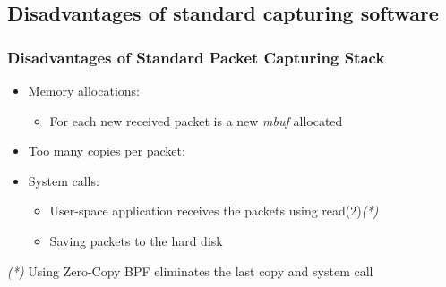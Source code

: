 \subsection*{Disadvantages of standard capturing software}
\begin{frame}
\frametitle{Disadvantages of Standard Packet Capturing Stack}
\begin{itemize}
	\item<2-> Memory allocations:
		\begin{itemize}
			\item<2-> For each new received packet is a new \emph{mbuf} 
				allocated\newline
		\end{itemize}


	\item<3-> Too many copies per packet:
		\begin{itemize}
		\end{itemize}

	\item<4-> System calls:
		\begin{itemize}
			\item<4-> User-space application receives the packets using read(2)\emph{(*)}
			\item<4-> Saving packets to the hard disk\newline
		\end{itemize}

\end{itemize}
\begin{tiny}
\emph{(*)} Using Zero-Copy BPF eliminates the last copy and system call
\end{tiny}
\end{frame}
